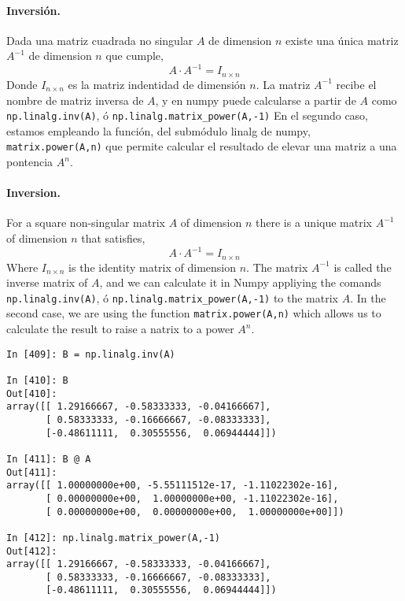 \begin{paracol}{2}
\paragraph{Inversión.} Dada una matriz cuadrada no singular $A$ de dimension $n$ existe una única matriz $A^{-1}$ de dimension $n$ que cumple,
\begin{equation*}
A\cdot A^{-1}=I_{n\times n}
\end{equation*}
Donde $I_{n\times n}$ es la matriz indentidad de dimensión $n$.
La matriz $A^{-1}$ recibe el nombre de matriz inversa de $A$, y  en numpy puede calcularse a partir de $A$ como \texttt{np.linalg.inv(A)}, ó \texttt{np.linalg.matrix_power(A,-1)}
En el segundo caso, estamos empleando la función, del submódulo linalg de numpy, \texttt{matrix.power(A,n)} que permite calcular el resultado de elevar una matriz a una pontencia $A^n$.
\switchcolumn
\paragraph{Inversion.} For a square non-singular matrix $A$ of dimension $n$ there is a unique matrix $A^{-1}$ of dimension $n$ that satisfies,
\begin{equation*}
	A\cdot A^{-1}=I_{n\times n}
\end{equation*}
Where $I_{n\times n}$ is the identity matrix of dimension $n$. The matrix $A^{-1}$ is called the inverse matrix of $A$, and we can calculate it in Numpy appliying the comands  \texttt{np.linalg.inv(A)}, ó \texttt{np.linalg.matrix_power(A,-1)} to the matrix $A$.
In the second case, we are using the function \texttt{matrix.power(A,n)} which allows us to calculate the result to raise a natrix to a power $A^n$. 
\end{paracol}
\begin{center}
\begin{minipage}{0.7\textwidth}
\begin{verbatim}
In [409]: B = np.linalg.inv(A)

In [410]: B
Out[410]: 
array([[ 1.29166667, -0.58333333, -0.04166667],
       [ 0.58333333, -0.16666667, -0.08333333],
       [-0.48611111,  0.30555556,  0.06944444]])

In [411]: B @ A
Out[411]: 
array([[ 1.00000000e+00, -5.55111512e-17, -1.11022302e-16],
       [ 0.00000000e+00,  1.00000000e+00, -1.11022302e-16],
       [ 0.00000000e+00,  0.00000000e+00,  1.00000000e+00]])

In [412]: np.linalg.matrix_power(A,-1)
Out[412]: 
array([[ 1.29166667, -0.58333333, -0.04166667],
       [ 0.58333333, -0.16666667, -0.08333333],
       [-0.48611111,  0.30555556,  0.06944444]])
\end{verbatim}
\end{minipage}
\end{center}

